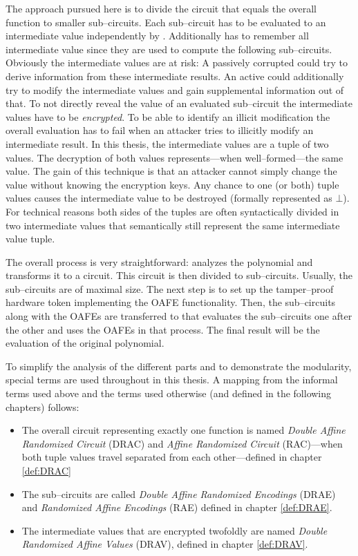 The approach pursued here is to divide the circuit that equals the overall
function to smaller sub--circuits. Each sub--circuit has to be evaluated to an
intermediate value independently by \JWpTwo{}. Additionally \JWpTwo{} has to
remember all intermediate value since they are used to compute the following
sub--circuits. Obviously the intermediate values are at risk: A passively
corrupted \JWpTwo{} could try to derive information from these intermediate
results. An active \JWpTwo{} could additionally try to modify the intermediate
values and gain supplemental information out of that. To not directly reveal the
value of an evaluated sub--circuit the intermediate values have to be
\emph{encrypted}. To be able to identify an illicit modification the overall
evaluation has to fail when an attacker tries to illicitly modify an
intermediate result. In this thesis, the intermediate values are a tuple of two
values. The decryption of both values represents---when well--formed---the same
value. The gain of this technique is that an attacker cannot simply change the
value without knowing the encryption keys. Any chance to one (or both) tuple
values causes the intermediate value to be destroyed (formally represented as
$\bot$). For technical reasons both sides of the tuples are often syntactically
divided in two intermediate values that semantically still represent the same
intermediate value tuple.

The overall process is very straightforward: \JWpOne{} analyzes the polynomial
and transforms it to a circuit. This circuit is then divided to sub--circuits.
Usually, the sub--circuits are of maximal size. The next step is to set up the
tamper--proof hardware token implementing the OAFE functionality. Then, the
sub--circuits along with the OAFEs are transferred to \JWpTwo{} that evaluates
the sub--circuits one after the other and uses the OAFEs in that process. The
final result will be the evaluation of the original polynomial.

To simplify the analysis of the different parts and to demonstrate the
modularity, special terms are used throughout in this thesis. A mapping from the
informal terms used above and the terms used otherwise (and defined in the
following chapters) follows:

\begin{itemize}

  \item The overall circuit representing exactly one function is named
    \emph{Double Affine Randomized Circuit} (DRAC) and \emph{Affine Randomized
    Circuit} (RAC)---when both tuple values travel separated from each
    other---defined in chapter \ref{def:DRAC}

  \item The sub--circuits are called \emph{Double Affine Randomized Encodings}
    (DRAE) and \emph{Randomized Affine Encodings} (RAE) defined in chapter
    \ref{def:DRAE}.

  \item The intermediate values that are encrypted twofoldly are named
    \emph{Double Randomized Affine Values} (DRAV), defined in chapter
    \ref{def:DRAV}.

\end{itemize}


